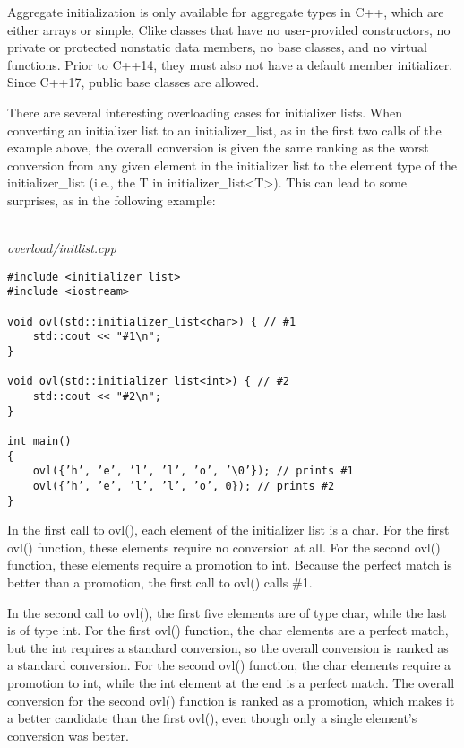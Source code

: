 \begin{tcolorbox}[colback=webgreen!5!white,colframe=webgreen!75!black]
\hspace*{0.75cm}Aggregate initialization is only available for aggregate types in C++, which are either arrays or simple, Clike classes that have no user-provided constructors, no private or protected nonstatic data members, no base classes, and no virtual functions. Prior to C++14, they must also not have a default member initializer. Since C++17, public base classes are allowed.
\end{tcolorbox}

There are several interesting overloading cases for initializer lists. When converting an initializer list to an initializer\_list, as in the first two calls of the example above, the overall conversion is given the same ranking as the worst conversion from any given element in the initializer list to the element type of the initializer\_list (i.e., the T in initializer\_list<T>). This can lead to some surprises, as in the following example:

\hspace*{\fill} \\ %
\noindent
\textit{overload/initlist.cpp}
\begin{lstlisting}[style=styleCXX]
#include <initializer_list>
#include <iostream>

void ovl(std::initializer_list<char>) { // #1
	std::cout << "#1\n";
}

void ovl(std::initializer_list<int>) { // #2
	std::cout << "#2\n";
}

int main()
{
	ovl({’h’, ’e’, ’l’, ’l’, ’o’, ’\0’}); // prints #1
	ovl({’h’, ’e’, ’l’, ’l’, ’o’, 0}); // prints #2
}
\end{lstlisting}

In the first call to ovl(), each element of the initializer list is a char. For the first ovl() function, these elements require no conversion at all. For the second ovl() function, these elements require a promotion to int. Because the perfect match is better than a promotion, the first call to ovl() calls \#1.

In the second call to ovl(), the first five elements are of type char, while the last is of type int. For the first ovl() function, the char elements are a perfect match, but the int requires a standard conversion, so the overall conversion is ranked as a standard conversion. For the second ovl() function, the char elements require a promotion to int, while the int element at the end is a perfect match. The overall conversion for the second ovl() function is ranked as a promotion, which makes it a better candidate than the first ovl(), even though only a single element’s conversion was better.

